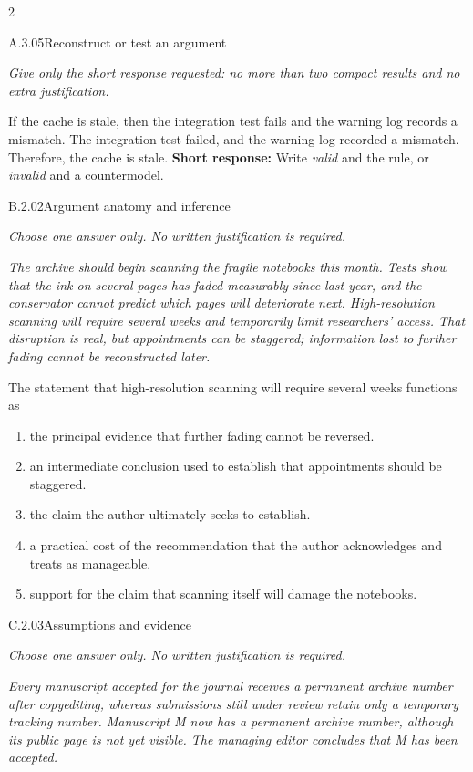 \documentclass[9pt]{extarticle}
\newcommand{\choice}[1]{\item #1}
\begin{document}
\CoreWorkArea
\FormBreak
{}
\begin{multicols}{2}
\begin{DenseCoreProblem}{A.3.05}{Reconstruct or test an argument}
{\scriptsize\textit{Give only the short response requested: no more than two compact results and no extra justification.}\par}
If the cache is stale, then the integration test fails and the warning log records a mismatch. The integration test failed, and the warning log recorded a mismatch. Therefore, the cache is stale.
\textbf{Short response:} Write \emph{valid} and the rule, or \emph{invalid} and a countermodel.
\end{DenseCoreProblem}
\begin{DenseCoreProblem}{B.2.02}{Argument anatomy and inference}
{\scriptsize\textit{Choose one answer only. No written justification is required.}\par}
\emph{The archive should begin scanning the fragile notebooks this month. Tests show that the ink on several pages has faded measurably since last year, and the conservator cannot predict which pages will deteriorate next. High-resolution scanning will require several weeks and temporarily limit researchers' access. That disruption is real, but appointments can be staggered; information lost to further fading cannot be reconstructed later.}

The statement that high-resolution scanning will require several weeks functions as
\begin{enumerate}[label=(\alph*)]
  \choice{the principal evidence that further fading cannot be reversed.}
  \choice{an intermediate conclusion used to establish that appointments should be staggered.}
  \choice{the claim the author ultimately seeks to establish.}
  \choice{a practical cost of the recommendation that the author acknowledges and treats as manageable.}
  \choice{support for the claim that scanning itself will damage the notebooks.}
\end{enumerate}
\end{DenseCoreProblem}
\columnbreak
\begin{DenseCoreProblem}{C.2.03}{Assumptions and evidence}
{\scriptsize\textit{Choose one answer only. No written justification is required.}\par}
\emph{Every manuscript accepted for the journal receives a permanent archive number after copyediting, whereas submissions still under review retain only a temporary tracking number. Manuscript M now has a permanent archive number, although its public page is not yet visible. The managing editor concludes that M has been accepted.}


\end{DenseCoreProblem}
\end{multicols}
\end{document}
